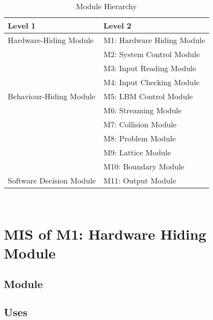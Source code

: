 \documentclass[12pt, titlepage]{article}
\begin{document}
\begin{table}[h!]
	\centering
	\begin{tabular}{p{} p{}}
		\toprule
		\textbf{Level 1} & \textbf{Level 2}\\
		\midrule
		
		{Hardware-Hiding Module}
		& M1: Hardware Hiding Module\\
		\midrule
		
		\multirow{7}{0.3\textwidth}{Behaviour-Hiding Module}
		& M2: System Control Module\\
		& M3: Input Reading Module\\
		& M4: Input Checking Module\\
		& M5: LBM Control Module\\
		& M6: Streaming Module\\
		& M7: Collision Module\\ 
		& M8: Problem Module\\
		& M9: Lattice Module\\
		& M10: Boundary Module\\
		\midrule
		
		\multirow{1}{0.3\textwidth}{Software Decision Module}
		& M11: Output Module\\
		\bottomrule
		
	\end{tabular}
	\caption{Module Hierarchy}
	\label{TblMH}
\end{table}


~\newpage

\section{MIS of M1: Hardware Hiding Module} \label{HHModule} 



\subsection{Module}


\subsection{Uses}
\end{document}
